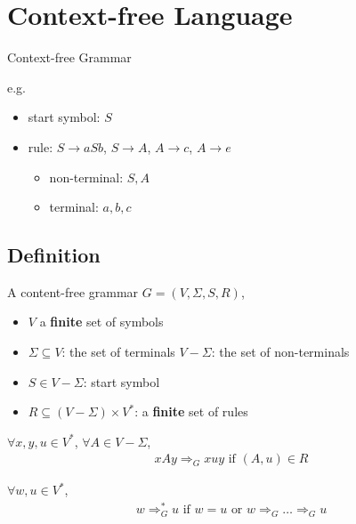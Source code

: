 \newpage
\section{Context-free Language}
Context-free Grammar

e.g. 
\begin{itemize}
    \item start symbol: $S$
    \item rule: $S \to aSb$, $S\to A$, $A\to c$, $A\to e$
    \begin{itemize}
        \item non-terminal: $S, A$
        \item terminal: $a,b,c$
    \end{itemize}
\end{itemize}

\subsection{Definition}

\begin{definition}
    A content-free grammar $G=(V,\Sigma, S, R)$,
    \begin{itemize}
        \item $V$ a \textbf{finite} set of symbols
        \item $\Sigma\subseteq V$: the set of terminals
        \subitem $V-\Sigma$: the set of non-terminals
        \item $S\in V-\Sigma$: start symbol
        \item $R\subseteq (V-\Sigma)\times V^*$: a \textbf{finite} set of rules
    \end{itemize}
\end{definition}

\begin{definition}
    $\forall x,y,u \in V^*$, $\forall A\in V-\Sigma$,
    \begin{align*}
        xAy\Rightarrow_G xuy \text{ if } (A,u)\in R
    \end{align*}
\end{definition}

\begin{definition}
    $\forall w,u \in V^*$,
    \begin{align*}
        w\Rightarrow_G^*u \text{ if } w=u\text{ or }w\Rightarrow_G \dots \Rightarrow_G u
    \end{align*}
\end{definition}

